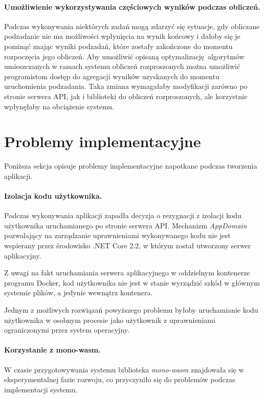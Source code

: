 \documentclass[a4paper,11pt,twoside]{report}
\theoremstyle{definition}
\begin{document}
        \paragraph{Umożliwienie wykorzystywania częściowych wyników podczas obliczeń.}
        Podczas wykonywania niektórych zadań mogą zdarzyć się sytuacje, gdy obliczane podzadanie nie ma możliwości wpłynięcia na wynik końcowy i dałoby się je pominąć znając wyniki podzadań, które zostały zakończone do momentu rozpoczęcia jego obliczeń.
        Aby umożliwić opisaną optymalizację algorytmów umieszczanych w ramach systemu obliczeń rozproszonych można umożliwić programistom dostęp do agregacji wyników uzyskanych do momentu uruchomienia podzadania.
        Taka zmiana wymagałaby modyfikacji zarówno po stronie serwera API, jak i biblioteki do obliczeń rozproszonych, ale korzystnie wpłynęłaby na obciążenie systemu.
        
    \section{Problemy implementacyjne}
        Poniższa sekcja opisuje problemy implementacyjne napotkane podczas tworzenia aplikacji.
        
        \paragraph{Izolacja kodu użytkownika.}
            Podczas wykonywania aplikacji zapadła decyzja o rezygnacji z izolacji kodu użytkownika uruchamianego po stronie serwera API. Mechanizm \textit{AppDomain} pozwalający na zarządzanie uprawnieniami wykonywanego kodu nie jest wspierany przez środowisko .NET Core 2.2, w którym został utworzony serwer aplikacyjny. 
            
            Z uwagi na fakt uruchamiania serwera aplikacyjnego w oddzielnym kontenerze programu Docker, kod użytkownika nie jest w stanie wyrządzić szkód w głównym systemie plików, a jedynie wewnątrz kontenera.
            
            Jednym z możliwych rozwiązań powyższego problemu byłoby uruchamianie kodu użytkownika w osobnym procesie jako użytkownik z uprawnieniami ograniczonymi przez system operacyjny.
            
        \paragraph{Korzystanie z mono-wasm.}     
            W czasie przygotowywania systemu biblioteka \textit{mono-wasm} znajdowała się w eksperymentalnej fazie rozwoju, co przyczyniło się do problemów podczas implementacji systemu.
            
\end{document}
